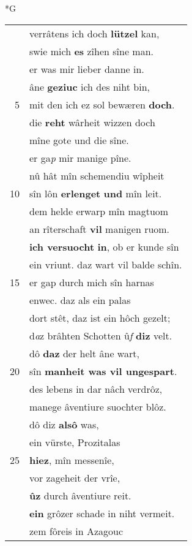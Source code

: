 \documentclass[8pt,a4paper,notitlepage]{article}
\begin{document}
\begin{table}[ht]
\begin{minipage}[t]{0.5\linewidth}
\small
\begin{center}*G
\end{center}
\begin{tabular}{rl}
 & verrâtens ich doch \textbf{lützel} kan,\\ 
 & swie mich \textbf{es} zîhen sîne man.\\ 
 & er was mir lieber danne in.\\ 
 & âne \textbf{geziuc} ich des niht bin,\\ 
5 & mit den ich ez sol bewæren \textbf{doch}.\\ 
 & die \textbf{reht} wârheit wizzen doch\\ 
 & mîne gote und die sîne.\\ 
 & er ga\textit{p} mir manige pîne.\\ 
 & nû hât mîn schemendiu wîpheit\\ 
10 & sîn lôn \textbf{erlenget} \textbf{und} mîn leit.\\ 
 & dem helde erwarp mîn magtuom\\ 
 & an rîterschaft \textbf{vil} manigen ruom.\\ 
 & \textbf{ich versuocht} \textbf{in}, ob er kunde sîn\\ 
 & ein vriunt. daz wart vil balde schîn.\\ 
15 & er gap durch mich sîn harnas\\ 
 & enwec. daz als ein palas\\ 
 & dort stêt, daz ist ein hôch gezelt;\\ 
 & d\textit{a}z brâhten Schotten û\textit{f} \textbf{diz} velt.\\ 
 & dô \textbf{daz} der helt âne wart,\\ 
20 & sîn \textbf{manheit was vil ungespart}.\\ 
 & des lebens in dar nâch verdrôz,\\ 
 & manege âventiure suochter blôz.\\ 
 & dô diz \textbf{alsô} was,\\ 
 & ein vürste, Prozitalas\\ 
25 & \textbf{hiez}, mîn messenîe,\\ 
 & vor zageheit der vrîe,\\ 
 & \textbf{ûz} durch âventiure reit.\\ 
 & \textbf{ein} grôzer schade in niht vermeit.\\ 
 & zem fôreis in Azagouc\\ 

\end{tabular}
\end{minipage}
\end{table}
\end{document}

